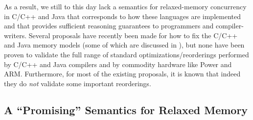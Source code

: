 



%


As a result, we still to this day lack a semantics for relaxed-memory
concurrency in C/C++ and Java that corresponds to how these languages
are implemented and that provides sufficient reasoning guarantees to
programmers and compiler-writers.  Several proposals have recently
been made for how to fix the C/C++ and Java memory models (some of which
are discussed in ), but none have been proven to
validate the full range of standard optimizations/reorderings
performed by C/C++ and Java compilers and by commodity hardware like
Power and ARM.  Furthermore, for most of the existing proposals, it is
known that indeed they do \emph{not} validate some important
reorderings.

\subsection{A ``Promising'' Semantics for Relaxed Memory}
\label{sec:promising}

